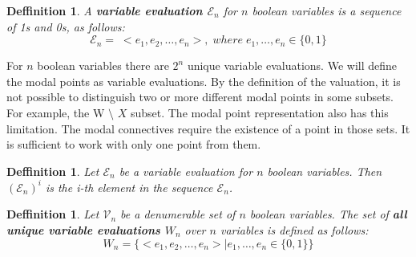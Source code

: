 \documentclass{article}
\newcommand\V{\mathcal{V}}
\newcommand\E{\mathcal{E}}
\newcommand\VX{X}
\newtheorem{defn}[theorem]{Deffinition}
\begin{document}
		
		
		\begin{defn}
			A \textbf{variable evaluation $\E_n$} for $n$ boolean variables is a sequence of 1s and 0s, as follows:
			\begin{equation}
				\E_n = \; < e_1, e_2, \ldots , e_n >, \; where \; e_1, \ldots, e_n \in \{0, 1 \}
			\end{equation}
		\end{defn}

		For $n$ boolean variables there are $2^n$ unique variable evaluations. We will define the modal points as variable evaluations. By the definition of the valuation, it is not possible to distinguish two or more different modal points in some subsets. For example, the W $\setminus$ $\VX$ subset. The modal point representation also has this limitation. The modal connectives require the existence of a point in those sets. It is sufficient to work with only one point from them.

		\begin{defn}
			Let $\E_n$ be a variable evaluation for $n$ boolean variables. Then $(\E_n)^i$ is the i-th element in the sequence $\E_n$.
		\end{defn}

		\begin{defn}
			Let $\V_n$ be a denumerable set of $n$ boolean variables. The set of \textbf{all unique variable evaluations $W_n$} over $n$ variables is defined as follows:
			\begin{equation}
				\label{all-unique-points}
				W_n = \{< e_1, e_2, \ldots , e_n > \mid e_1, \ldots, e_n \in \{0, 1 \} \}
			\end{equation}
		\end{defn}
\end{document}
